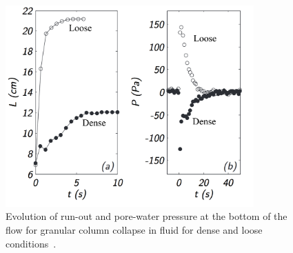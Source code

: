\begin{figure}[htbp]
\centering
\includegraphics[width=0.85\textwidth]{Runout_PWP_Fluid_Exp}
\caption{Evolution of run-out and pore-water pressure at the bottom of the flow 
for 
granular column collapse in fluid for dense and loose 
conditions~\citep{Rondon2011}.}
\label{fig:Runout_PWP_Fluid_Exp}
\end{figure}

